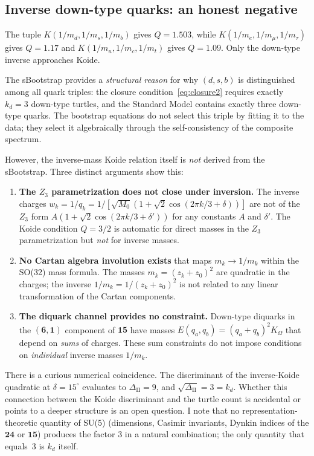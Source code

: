 \documentclass[prd,twocolumn,superscriptaddress,nofootinbib]{revtex4-2}
\begin{document}
\subsection{Inverse down-type quarks: an honest negative}
\label{sec:inverse}

The tuple $K(1/m_d,1/m_s,1/m_b)$ gives $Q=1.503$, while
$K(1/m_e,1/m_\mu,1/m_\tau)$ gives $Q=1.17$ and
$K(1/m_u,1/m_c,1/m_t)$ gives $Q=1.09$.  Only the down-type inverse
approaches Koide.

The sBootstrap provides a \emph{structural reason} for why $(d,s,b)$ is
distinguished among all quark triples: the closure
condition~\eqref{eq:closure2} requires exactly $k_d=3$ down-type
turtles, and the Standard Model contains exactly three down-type quarks.
The bootstrap equations do not select this triple by fitting it to the
data; they select it algebraically through the self-consistency of the
composite spectrum.

However, the inverse-mass Koide relation itself is \emph{not} derived
from the sBootstrap.  Three distinct arguments show this:

\begin{enumerate}
\item \textbf{The $Z_3$ parametrization does not close under inversion.}
The inverse charges $w_k = 1/q_k = 1/[\sqrt{M_0}(1+\sqrt{2}\cos(2\pi
k/3+\delta))]$ are not of the $Z_3$ form $A(1+\sqrt{2}\cos(2\pi
k/3+\delta'))$ for any constants $A$ and $\delta'$.  The Koide condition
$Q=3/2$ is automatic for direct masses in the $Z_3$ parametrization but
\emph{not} for inverse masses.

\item \textbf{No Cartan algebra involution exists} that maps $m_k\to
1/m_k$ within the SO(32) mass formula.  The masses $m_k=(z_k+z_0)^2$
are quadratic in the charges; the inverse $1/m_k = 1/(z_k+z_0)^2$ is
not related to any linear transformation of the Cartan components.

\item \textbf{The diquark channel provides no constraint.}  Down-type
diquarks in the $(\mathbf{6},\mathbf{1})$ component of $\mathbf{15}$
have masses $E(q_a,q_b)=(q_a+q_b)^2 K_\Omega$ that depend on
\emph{sums} of charges.  These sum constraints do not impose conditions
on \emph{individual} inverse masses $1/m_k$.
\end{enumerate}

\noindent There is a curious numerical coincidence.  The discriminant of
the inverse-Koide quadratic at $\delta=15^\circ$ evaluates to
$\Delta_{\text{II}}=9$, and $\sqrt{\Delta_{\text{II}}}=3=k_d$.  Whether
this connection between the Koide discriminant and the turtle count is
accidental or points to a deeper structure is an open question.  I note
that no representation-theoretic quantity of SU(5) (dimensions, Casimir
invariants, Dynkin indices of the $\mathbf{24}$ or $\mathbf{15}$)
produces the factor 3 in a natural combination; the only quantity that
equals~3 is $k_d$ itself.
\end{document}
